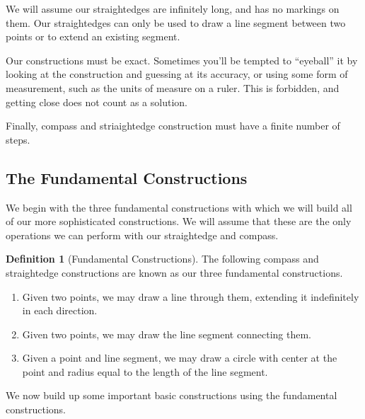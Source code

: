 \documentclass[11pt]{article}
\theoremstyle{definition}
\newtheorem{definition}[theorem]{Definition}
\begin{document}
We will assume our straightedges are infinitely long, and has no markings on them. Our straightedges can only be used to draw a line segment between 
two points or to extend an existing segment.  

Our constructions must be exact. Sometimes you'll be tempted to ``eyeball'' it by looking at the construction and guessing at its accuracy, 
or using some form of measurement, such as the units of measure on a ruler. This is forbidden, and getting close does not count as a solution.

Finally, compass and striaightedge construction must have a finite number of steps.

\subsection{The Fundamental Constructions}

We begin with the three fundamental constructions with which we will build all of our more sophisticated constructions. We will assume that these
are the only operations we can perform with our straightedge and compass.

\begin{definition}[Fundamental Constructions] The following compass and straightedge constructions are known as our three fundamental constructions.
  \begin{enumerate}
    \item Given two points, we may draw a line through them, extending it indefinitely in each direction.
    \item Given two points, we may draw the line segment connecting them.
    \item Given a point and line segment, we may draw a circle with center at the point and radius equal to the length of the line segment.
  \end{enumerate}
\end{definition}

We now build up some important basic constructions using the fundamental constructions.
\end{document}
